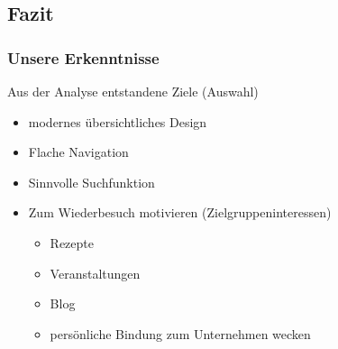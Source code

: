\subsection{Fazit}
\begin{frame}
	\frametitle{Unsere Erkenntnisse}
	Aus der Analyse entstandene Ziele (Auswahl)
	\begin{itemize}
		\item modernes übersichtliches Design %
		\item Flache Navigation
		\item Sinnvolle Suchfunktion %
		\item Zum Wiederbesuch motivieren (Zielgruppeninteressen)
			\begin{itemize}
				\item Rezepte
				\item Veranstaltungen
				\item Blog
				\item persönliche Bindung zum Unternehmen wecken
			\end{itemize}
	\end{itemize}
\end{frame}

